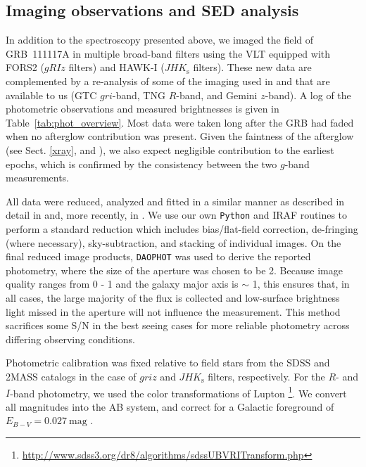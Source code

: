 \documentclass[referee]{aa}
\begin{document}
\subsection{Imaging observations and SED analysis} \label{SED}

In addition to the spectroscopy presented above, we imaged the field of
GRB~111117A in multiple broad-band filters using the VLT equipped with FORS2
($gRIz$ filters) and HAWK-I ($JHK_{\mathrm{s}}$ filters). These new data are
complemented by a re-analysis of some of the imaging used in
\citet{Margutti2012} and \citet{Sakamoto2013} that are available to us (GTC
$gri$-band, TNG $R$-band, and Gemini $z$-band). A log of the photometric
observations and measured brightnesses is given in
Table~\ref{tab:phot_overview}. Most data were taken long after the GRB had faded
when no afterglow contribution was present. Given the faintness of the afterglow
(see Sect. \ref{xray}, and \citealt{Cucchiara2011, Cenko2011}), we also expect
negligible contribution to the earliest epochs, which is confirmed by the
consistency between the two $g$-band measurements.

All data were reduced, analyzed and fitted in a similar manner as described in
detail in \citet{Kruhler2011a} and, more recently, in \citet{Schulze2016}. We
use our own \texttt{Python} and IRAF routines to perform a standard reduction
which includes bias/flat-field correction, de-fringing (where necessary),
sky-subtraction, and stacking of individual images. On the final reduced image
products, \texttt{DAOPHOT} \citep{Stetson1987} was used to derive the reported
photometry, where the size of the aperture was chosen to be 2. Because
image quality ranges from 0 - 1 and the galaxy major axis is $\sim$
1\farc, this ensures that, in all cases, the large majority of the flux is
collected and low-surface brightness light missed in the aperture will not
influence the measurement. This method sacrifices some S/N in the best seeing
cases for more reliable photometry across differing observing conditions.

Photometric calibration was fixed relative to field stars from the SDSS and
2MASS catalogs in the case of $griz$ and $JHK_{\mathrm{s}}$ filters,
respectively. For the $R$- and $I$-band photometry, we used the color
transformations of Lupton%
\footnote{\url{http://www.sdss3.org/dr8/algorithms/sdssUBVRITransform.php}}. We
convert all magnitudes into the AB system, and correct for a Galactic foreground
of $E_{B-V}=0.027~\mathrm{mag}$ \citep{Schlegel1998, Schlafly2011}.
\end{document}
